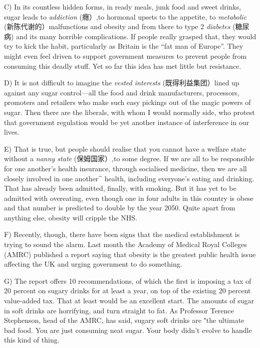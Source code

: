 \documentclass[UTF8,11pt]{ctexart}
\begin{document}
C) In its countless hidden forms, in ready meals, junk food and sweet drinks, sugar leads to\textit{ addiction} (癮）,to hormonal upsets to the appetite, to\textit{ metabolic} (新陈代谢的）malfunctions and obesity and from there to type 2\textit{ diabetes} (糖尿病) and its many horrible complications. If people really grasped that, they would try to kick the habit, particularly as Britain is the “fat man of Europe”. They might even feel driven to support government measures to prevent people from consuming this deadly stuff. Yet so far this idea has met little but resistance.


D) It is not difficult to imagine the\textit{ vested interests} (既得利益集团）lined up against any sugar control—all the food and drink manufacturers, processors, promoters and retailers who make such easy pickings out of the magic powers of sugar. Then there are the liberals, with whom I would normally side, who protest that government regulation would be yet another instance of interference in our lives.


E) That is true, but people should realise that you cannot have a welfare state without a\textit{ nanny state} (保姆国家）,to some degree. If we are all to be responsible for one another’s health insurance, through socialised medicine, then we are all closely involved in one another\textasciicircum{} health, including everyone’s eating and drinking. That has already been admitted, finally, with smoking. But it has yet to be admitted with overeating, even though one in four adults in this country is obese and that number is predicted to double by the year 2050. Quite apart from anything else, obesity will cripple the NHS.


F) Recently, though, there have been signs that the medical establishment is trying to sound the alarm. Last month the Academy of Medical Royal Colleges (AMRC) published a report saying that obesity is the greatest public health issue affecting the UK and urging government to do something.


G) The report offers 10 recommendations, of which the first is imposing a tax of 20 percent on sugary drinks for at least a year, on top of the existing 20 percent value-added tax. That at least would be an excellent start. The amounts of sugar in soft drinks are horrifying, and turn straight to fat. As Professor Terence Stephenson, head of the AMRC, has said, sugary soft drinks are "the ultimate bad food. You are just consuming neat sugar. Your body didn’t evolve to handle this kind of thing.
\end{document}
